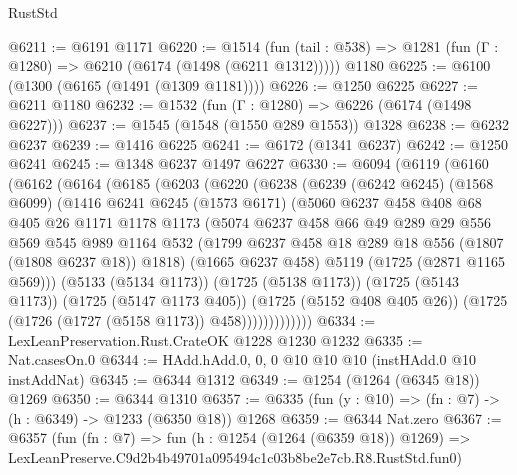 \begin{lexlean}{RustStd}
\begin{coremodule}
@6211 := @6191 @1171
@6220 := @1514
    (fun (tail : @538) => @1281 (fun (Γ : @1280) => @6210 (@6174 (@1498 (@6211 @1312)))))
    @1180
@6225 := @6100 (@1300 (@6165 (@1491 (@1309 @1181))))
@6226 := @1250 @6225
@6227 := @6211 @1180
@6232 := @1532 (fun (Γ : @1280) => @6226 (@6174 (@1498 @6227)))
@6237 := @1545 (@1548 (@1550 @289 @1553)) @1328
@6238 := @6232 @6237
@6239 := @1416 @6225
@6241 := @6172 (@1341 @6237)
@6242 := @1250 @6241
@6245 := @1348 @6237 @1497 @6227
@6330 := @6094
    (@6119
      (@6160
        (@6162
          (@6164
            (@6185
              (@6203
                (@6220
                  (@6238
                    (@6239
                      (@6242 @6245)
                      (@1568 @6099)
                      (@1416
                        @6241
                        @6245
                        (@1573 @6171)
                        (@5060
                          @6237
                          @458
                          @408
                          @68
                          @405
                          @26
                          @1171
                          @1178
                          @1173
                          (@5074
                            @6237
                            @458
                            @66
                            @49
                            @289
                            @29
                            @556
                            @569
                            @545
                            @989
                            @1164
                            @532
                            (@1799 @6237 @458 @18 @289 @18 @556 (@1807 (@1808 @6237 @18)) @1818)
                            (@1665 @6237 @458)
                            @5119
                            (@1725 (@2871 @1165 @569)))
                          (@5133 (@5134 @1173))
                          (@1725 (@5138 @1173))
                          (@1725 (@5143 @1173))
                          (@1725 (@5147 @1173 @405))
                          (@1725 (@5152 @408 @405 @26))
                          (@1725 (@1726 (@1727 (@5158 @1173)) @458)))))))))))))
@6334 := LexLeanPreservation.Rust.CrateOK @1228 @1230 @1232
@6335 := Nat.casesOn.{0}
@6344 := HAdd.hAdd.{0, 0, 0} @10 @10 @10 (instHAdd.{0} @10 instAddNat)
@6345 := @6344 @1312
@6349 := @1254 (@1264 (@6345 @18)) @1269
@6350 := @6344 @1310
@6357 := @6335 (fun (y : @10) => (fn : @7) -> (h : @6349) -> @1233 (@6350 @18)) @1268
@6359 := @6344 Nat.zero
@6367 := @6357
    (fun (fn : @7) =>
    fun (h : @1254 (@1264 (@6359 @18)) @1269) =>
    LexLeanPreserve.C9d2b4b49701a095494c1c03b8be2e7cb.R8.RustStd.fun0)

\end{coremodule}
\end{lexlean}
